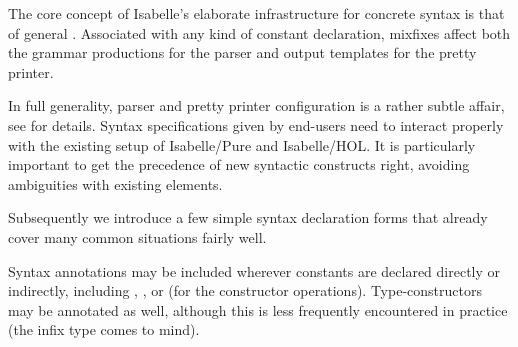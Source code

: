 %
\begin{isabellebody}%
\def\isabellecontext{Documents}%
\isamarkupfalse%
%
\isamarkuptrue%
%
\begin{isamarkuptext}%
The core concept of Isabelle's elaborate infrastructure for concrete
  syntax is that of general .  Associated
  with any kind of constant declaration, mixfixes affect both the
  grammar productions for the parser and output templates for the
  pretty printer.

  In full generality, parser and pretty printer configuration is a
  rather subtle affair, see \cite{isabelle-ref} for details.  Syntax
  specifications given by end-users need to interact properly with the
  existing setup of Isabelle/Pure and Isabelle/HOL.  It is
  particularly important to get the precedence of new syntactic
  constructs right, avoiding ambiguities with existing elements.

  \medskip Subsequently we introduce a few simple syntax declaration
  forms that already cover many common situations fairly well.%
\end{isamarkuptext}%
\isamarkuptrue%
%
\isamarkuptrue%
%
\begin{isamarkuptext}%
Syntax annotations may be included wherever constants are declared
  directly or indirectly, including ,
  , or  (for the
  constructor operations).  Type-constructors may be annotated as
  well, although this is less frequently encountered in practice (the
  infix type \isa{{\isasymtimes}} comes to mind).


\end{isamarkuptext}
\end{isabellebody}
